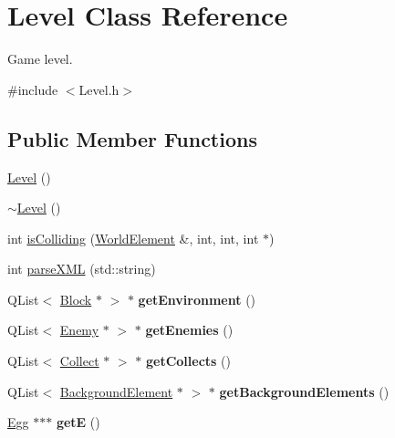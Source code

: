\hypertarget{classLevel}{
\section{Level Class Reference}
\label{classLevel}
}


Game level.  


{\ttfamily \#include $<$Level.h$>$}\subsection*{Public Member Functions}
\begin{DoxyCompactItemize}
\item 
\hyperlink{classLevel_a7a696c928ca5d5354db6e50e46d0f67d}{Level} ()
\item 
\hyperlink{classLevel_a249eac1e8f19ff44134efa5e986feaca}{$\sim$Level} ()
\item 
int \hyperlink{classLevel_a53dad6c67eae24dd703343894fd4a108}{isColliding} (\hyperlink{classWorldElement}{WorldElement} \&, int, int, int $\ast$)
\item 
int \hyperlink{classLevel_add706d11e20076169ede9af12f4c58bc}{parseXML} (std::string)
\item 
\hypertarget{classLevel_afefb97073ebaf8c3376c5e681d4dfd26}{
QList$<$ \hyperlink{classBlock}{Block} $\ast$ $>$ $\ast$ {\bfseries getEnvironment} ()}
\label{classLevel_afefb97073ebaf8c3376c5e681d4dfd26}

\item 
\hypertarget{classLevel_a3bec1fb83c924bda95bf1573523c3aef}{
QList$<$ \hyperlink{classEnemy}{Enemy} $\ast$ $>$ $\ast$ {\bfseries getEnemies} ()}
\label{classLevel_a3bec1fb83c924bda95bf1573523c3aef}

\item 
\hypertarget{classLevel_ab23e28c8277d826abe504a34d2e4e41d}{
QList$<$ \hyperlink{classCollect}{Collect} $\ast$ $>$ $\ast$ {\bfseries getCollects} ()}
\label{classLevel_ab23e28c8277d826abe504a34d2e4e41d}

\item 
\hypertarget{classLevel_aab8deb5d1590b6299ee65c929b115f48}{
QList$<$ \hyperlink{classBackgroundElement}{BackgroundElement} $\ast$ $>$ $\ast$ {\bfseries getBackgroundElements} ()}
\label{classLevel_aab8deb5d1590b6299ee65c929b115f48}

\item 
\hypertarget{classLevel_ae88a52fc60f454e43b82f81d68ad88f3}{
\hyperlink{classEgg}{Egg} $\ast$$\ast$$\ast$ {\bfseries getE} ()}
\label{classLevel_ae88a52fc60f454e43b82f81d68ad88f3}


\end{DoxyCompactItemize}
